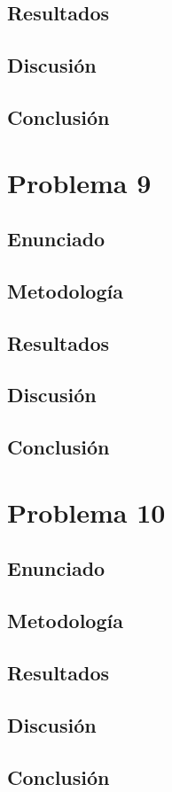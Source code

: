 \documentclass{article}
\begin{document}
\subsection{Resultados}
\setcounter{equation}{0}

\subsection{Discusión}

\subsection{Conclusión}

\section{Problema 9}

\subsection{Enunciado}

\subsection{Metodología}

\subsection{Resultados}
\setcounter{equation}{0}

\subsection{Discusión}

\subsection{Conclusión}

\section{Problema 10}

\subsection{Enunciado}

\subsection{Metodología}

\subsection{Resultados}
\setcounter{equation}{0}

\subsection{Discusión}

\subsection{Conclusión}
\end{document}
